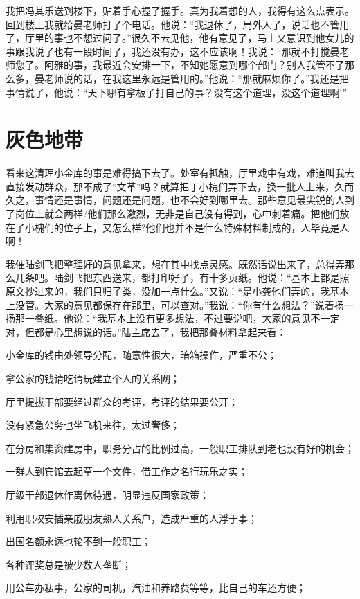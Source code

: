 \documentclass[12pt,oneside]{book}
\begin{document}
我把冯其乐送到楼下，贴着手心握了握手。真为我着想的人，我得有这么点表示。回到楼上我就给晏老师打了个电话。他说：``我退休了，局外人了，说话也不管用了，厅里的事也不想过问了。''很久不去见他，他有意见了，马上又意识到他女儿的事跟我说了也有一段时间了，我还没有办，这不应该啊！我说：``那就不打搅晏老师您了。阿雅的事，我最近会安排一下，不知她愿意到哪个部门？别人我管不了那么多，晏老师说的话，在我这里永远是管用的。''他说：``那就麻烦你了。''我还是把事情说了，他说：``天下哪有拿板子打自己的事？没有这个道理，没这个道理啊!''


\chapter{灰色地带}

看来这清理小金库的事是难得搞下去了。处室有抵触，厅里戏中有戏，难道叫我去直接发动群众，那不成了``文革''吗？就算把丁小槐们弄下去，换一批人上来，久而久之，事情还是事情，问题还是问题，也不会好到哪里去。那些意见最尖锐的人到了岗位上就会两样?他们那么激烈，无非是自己没有得到，心中刺着痛。把他们放在了小槐们的位子上，又怎么样?他们也并不是什么特殊材料制成的，人毕竟是人啊！

我催陆剑飞把整理好的意见拿来，想在其中找点灵感。既然话说出来了，总得弄那么几条吧。陆剑飞把东西送来，都打印好了，有十多页纸。他说：``基本上都是照原文抄过来的，我们只归了类，没加一点什么。''又说：``是小龚他们弄的，我基本上没管。大家的意见都保存在那里，可以查对。''我说：``你有什么想法？''说着扬一扬那一叠纸。他说：``我基本上没有更多想法，不过要说吧，大家的意见不一定对，但都是心里想说的话。''陆主席去了，我把那叠材料拿起来看：

小金库的钱由处领导分配，随意性很大，暗箱操作，严重不公；

拿公家的钱请吃请玩建立个人的关系网；

厅里提拔干部要经过群众的考评，考评的结果要公开；

没有紧急公务也坐飞机来往，太过奢侈；

在分房和集资建房中，职务分占的比例过高，一般职工排队到老也没有好的机会；

一群人到宾馆去起草一个文件，借工作之名行玩乐之实；

厅级干部退休作离休待遇，明显违反国家政策；

利用职权安插亲戚朋友熟人关系户，造成严重的人浮于事；

出国名额永远也轮不到一般职工；

各种评奖总是被少数人垄断；

用公车办私事，公家的司机，汽油和养路费等等，比自己的车还方便；
\end{document}

